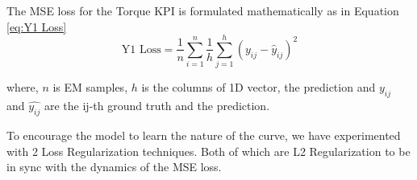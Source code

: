 \documentclass{report} %
\begin{document}
The \ac{MSE} loss for the Torque \ac{KPI} is formulated mathematically as in Equation \ref{eq:Y1 Loss}
\begin{equation}
    \text{Y1 Loss} = \frac{1}{n} \sum_{i=1}^{n} \frac{1}{h} \sum_{j=1}^{h} (y_{ij} - \hat{y}_{ij})^2
    \label{eq:Y1 Loss}
\end{equation} 

where, \(n\) is \ac{EM} samples, \(h\) is the columns of 1D vector, the prediction and \(y_{ij}\) and $\hat{y_{ij}}$ are the ij-th ground truth and the prediction.

To encourage the model to learn the nature of the curve, we have experimented with 2 Loss Regularization techniques. Both of which are L2 Regularization to be in sync with the dynamics of the \ac{MSE} loss.\\
\end{document}
